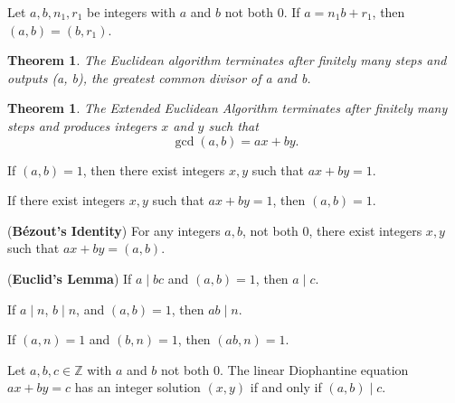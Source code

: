 \documentclass{article}
\newtheorem{theorem}{Theorem}
\newtheorem*{theorem*}{Theorem}
\theoremstyle{definition}
\newenvironment{manualtheorem}[1]{%
  \renewcommand{\thetheorem}{#1}%
  \theorem%
}{%
  \endtheorem%
}
\begin{document}
\begin{manualtheorem}{1.33}
	Let $a, b, n_{1}, r_{1}$ be integers with $a$ and $b$ not both $0$.
	If $a = n_{1}b + r_{1}$, then $(a, b) = (b, r_{1})$.
\end{manualtheorem}

\begin{theorem*}
	The Euclidean algorithm terminates after finitely many steps and outputs
	(a, b), the greatest common divisor of a and b.
\end{theorem*}

\begin{theorem}
	The Extended Euclidean Algorithm terminates after finitely many steps and
	produces integers $x$ and $y$ such that
	\[
		\gcd(a,b) = ax + by.
	\]
\end{theorem}


\begin{manualtheorem}{1.38}
	If $(a,b)=1$, then there exist integers $x,y$ such that $ax+by=1$.
\end{manualtheorem}

\begin{manualtheorem}{1.39}
	If there exist integers $x,y$ such that $ax+by=1$, then $(a,b)=1$.
\end{manualtheorem}

\begin{manualtheorem}{1.40}
	(\textbf{B\'ezout's Identity}) For any integers $a,b$, not both $0$, there exist integers $x,y$ such that $ax+by=(a,b)$.
\end{manualtheorem}

\begin{manualtheorem}{1.41}
	(\textbf{Euclid's Lemma}) If $a \mid bc$ and $(a,b)=1$, then $a \mid c$.
\end{manualtheorem}

\begin{manualtheorem}{1.42}
	If $a \mid n$, $b \mid n$, and $(a,b)=1$, then $ab \mid n$.
\end{manualtheorem}

\begin{manualtheorem}{1.43}
	If $(a,n)=1$ and $(b,n)=1$, then $(ab,n)=1$.
\end{manualtheorem}

\begin{manualtheorem}{1.48}
	Let $a,b,c \in \mathbb{Z}$ with $a$ and $b$ not both $0$. The linear Diophantine equation $ax+by=c$ has an integer solution $(x,y)$ if and only if $(a,b)\mid c$.
\end{manualtheorem}
\end{document}

